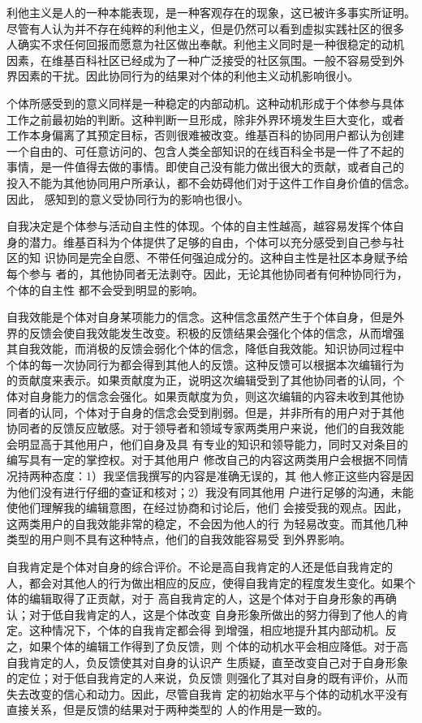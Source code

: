 利他主义是人的一种本能表现，是一种客观存在的现象，这已被许多事实所证明。
尽管有人认为并不存在纯粹的利他主义，但是仍然可以看到虚拟实践社区的很多
人确实不求任何回报而愿意为社区做出奉献。利他主义同时是一种很稳定的动机
因素，在维基百科社区已经成为了一种广泛接受的社区氛围。一般不容易受到外
界因素的干扰。因此协同行为的结果对个体的利他主义动机影响很小。

个体所感受到的意义同样是一种稳定的内部动机。这种动机形成于个体参与具体
工作之前最初始的判断。这种判断一旦形成，除非外界环境发生巨大变化，或者
工作本身偏离了其预定目标，否则很难被改变。维基百科的协同用户都认为创建
一个自由的、可任意访问的、包含人类全部知识的在线百科全书是一件了不起的
事情，是一件值得去做的事情。即使自己没有能力做出很大的贡献，或者自己的
投入不能为其他协同用户所承认，都不会妨碍他们对于这件工作自身价值的信念。因此，
感知到的意义受协同行为的影响也很小。

自我决定是个体参与活动自主性的体现。个体的自主性越高，越容易发挥个体自
身的潜力。维基百科为个体提供了足够的自由，个体可以充分感受到自己参与社
区的知
识协同是完全自愿、不带任何强迫成分的。这种自主性是社区本身赋予给每个参与
者的，其他协同者无法剥夺。因此，无论其他协同者有何种协同行为，个体的自主性
都不会受到明显的影响。

自我效能是个体对自身某项能力的信念。这种信念虽然产生于个体自身，但是外
界的反馈会使自我效能发生改变。积极的反馈结果会强化个体的信念，从而增强
其自我效能，而消极的反馈会弱化个体的信念，降低自我效能。知识协同过程中
个体的每一次协同行为都会得到其他人的反馈。这种反馈可以根据本次编辑行为
的贡献度来表示。如果贡献度为正，说明这次编辑受到了其他协同者的认同，个
体对自身能力的信念会强化。如果贡献度为负，则这次编辑的内容未收到其他协
同者的认同，个体对于自身的信念会受到削弱。但是，并非所有的用户对于其他
协同者的反馈反应敏感。对于领导者和领域专家两类用户来说，他们的自我效能
会明显高于其他用户，他们自身及具
有专业的知识和领导能力，同时又对条目的编写具有一定的掌控权。对于其他用户
修改自己的内容这两类用户会根据不同情况持两种态度：1）我坚信我撰写的内容是准确无误的，其
他人修正这些内容是因为他们没有进行仔细的查证和核对；2）我没有同其他用
户进行足够的沟通，未能使他们理解我的编辑意图，在经过协商和讨论后，他们
会接受我的观点。因此，这两类用户的自我效能非常的稳定，不会因为他人的行
为轻易改变。而其他几种类型的用户则不具有这种特点，他们的自我效能容易受
到外界影响。

自我肯定是个体对自身的综合评价。不论是高自我肯定的人还是低自我肯定的
人，都会对其他人的行为做出相应的反应，使得自我肯定的程度发生变化。如果个体的编辑取得了正贡献，对于
高自我肯定的人，这是个体对于自身形象的再确认；对于低自我肯定的人，这是个体改变
自身形象所做出的努力得到了他人的肯定。这种情况下，个体的自我肯定都会得
到增强，相应地提升其内部动机。反之，如果个体的编辑工作得到了负反馈，则
个体的动机水平会相应降低。对于高自我肯定的人，负反馈使其对自身的认识产
生质疑，直至改变自己对于自身形象的定位；对于低自我肯定的人来说，负反馈
则强化了其对自身的既有评价，从而失去改变的信心和动力。因此，尽管自我肯
定的初始水平与个体的动机水平没有直接关系，但是反馈的结果对于两种类型的
人的作用是一致的。

